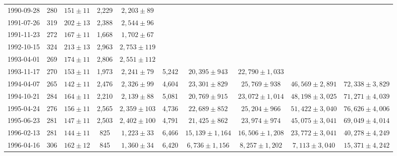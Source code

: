 \documentclass[12pt,letterpaper]{article}
\begin{document}
\begin{landscape}
\begin{longtable}{cccccccccc}
 {1990-09-28} &  280 &  {$151  \pm  11$} &  2,229 &   {$2,203 \pm 89$} &        &                       &                       &                       &                       \\
 {1991-07-26} &  319 &  {$202  \pm  13$} &  2,388 &   {$2,544 \pm 96$} &        &                       &                       &                       &                       \\
 {1991-11-23} &  272 &  {$167  \pm  11$} &  1,668 &   {$1,702 \pm 67$} &        &                       &                       &                       &                       \\
 {1992-10-15} &  324 &  {$213  \pm  13$} &  2,963 &  {$2,753 \pm 119$} &        &                       &                       &                       &                       \\
 {1993-04-01} &  269 &  {$174  \pm  11$} &  2,806 &  {$2,551 \pm 112$} &        &                       &                       &                       &                       \\
 {1993-11-17} &  270 &  {$153  \pm  11$} &  1,973 &   {$2,241 \pm 79$} &  5,242 &    {$20,395 \pm 943$} &  {$22,790 \pm 1,033$} &                       &                       \\
 {1994-04-07} &  265 &  {$142  \pm  11$} &  2,476 &   {$2,326 \pm 99$} &  4,604 &    {$23,301 \pm 829$} &    {$25,769 \pm 938$} &  {$46,569 \pm 2,891$} &  {$72,338 \pm 3,829$} \\
 {1994-10-21} &  284 &  {$164  \pm  11$} &  2,210 &   {$2,139 \pm 88$} &  5,081 &    {$20,769 \pm 915$} &  {$23,072 \pm 1,014$} &  {$48,198 \pm 3,025$} &  {$71,271 \pm 4,039$} \\
 {1995-04-24} &  276 &  {$156  \pm  11$} &  2,565 &  {$2,359 \pm 103$} &  4,736 &    {$22,689 \pm 852$} &    {$25,204 \pm 966$} &  {$51,422 \pm 3,040$} &  {$76,626 \pm 4,006$} \\
 {1995-06-23} &  281 &  {$147  \pm  11$} &  2,503 &  {$2,402 \pm 100$} &  4,791 &    {$21,425 \pm 862$} &    {$23,974 \pm 974$} &  {$45,075 \pm 3,041$} &  {$69,049 \pm 4,014$} \\
 {1996-02-13} &  281 &  {$144  \pm  11$} &    825 &   {$1,223 \pm 33$} &  6,466 &  {$15,139 \pm 1,164$} &  {$16,506 \pm 1,208$} &  {$23,772 \pm 3,041$} &  {$40,278 \pm 4,249$} \\
 {1996-04-16} &  306 &  {$162  \pm  12$} &    845 &   {$1,360 \pm 34$} &  6,420 &   {$6,736 \pm 1,156$} &   {$8,257 \pm 1,202$} &   {$7,113 \pm 3,040$} &  {$15,371 \pm 4,242$} \\

\end{longtable}
\end{landscape}
\end{document}
